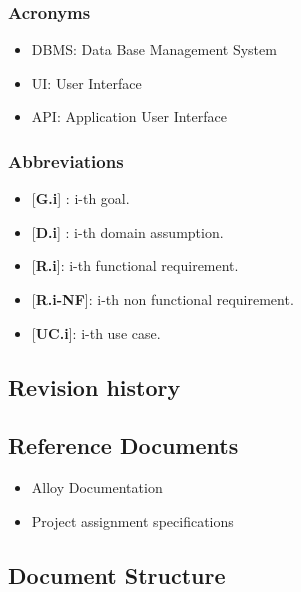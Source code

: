     \subsubsection{Acronyms}
    \begin{itemize}
        \item DBMS: Data Base Management System
        \item UI: User Interface
        \item API: Application User Interface
    \end{itemize}
    \subsubsection{Abbreviations}
        \begin{itemize}
            \item {[\textbf{G.i}]} : i-th goal.
            \item {[\textbf{D.i}]} : i-th domain assumption.
            \item {[\textbf{R.i}]}: i-th functional requirement.
            \item {[\textbf{R.i-NF}]}: i-th non functional requirement.
            \item {[\textbf{UC.i}]}: i-th use case.
        \end{itemize}
    

\subsection{Revision
history}

\subsection{Reference
Documents}
    \begin{itemize}
        \item Alloy Documentation
        \item Project assignment specifications
    \end{itemize}

\subsection{Document
Structure}


